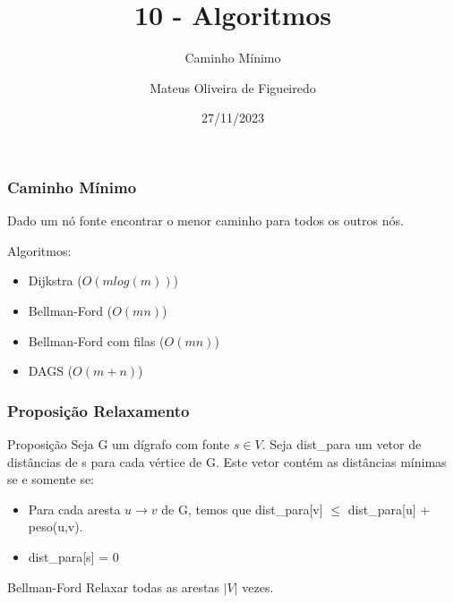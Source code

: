 \documentclass[aspectratio=169,usenames,dvipsnames]{beamer}
\title{10 - Algoritmos}
\subtitle{Caminho Mínimo}
\author{Mateus Oliveira de Figueiredo}
\date{27/11/2023}
\begin{document}
\begin{frame}
\titlepage
\end{frame}

\begin{frame}
\frametitle{Caminho Mínimo}

Dado um nó fonte encontrar o menor caminho para todos os outros nós.

\vfill
Algoritmos:
\begin{itemize}
  \item Dijkstra ($O(mlog(m))$)
  \item Bellman-Ford ($O(mn)$)
  \item Bellman-Ford com filas ($O(mn)$)
  \item DAGS ($O(m+n)$)
\end{itemize}
\vfill
\end{frame}


\begin{frame}
\frametitle{Proposição Relaxamento}

\vfill
\begin{block}{Proposição}
Seja G um dígrafo com fonte $s \in V$. Seja dist\_para um vetor de distâncias de s para cada vértice de G. 
Este vetor contém as distâncias mínimas se e somente se:
\begin{itemize}
  \item Para cada aresta $u \rightarrow v$ de G, temos que dist\_para[v] $\leq$ dist\_para[u] + peso(u,v).
  \item dist\_para[s] = 0
\end{itemize}
\end{block}
\vfill

\end{frame}

\begin{frame}{Bellman-Ford}
    Relaxar todas as arestas $|V|$ vezes.

    \vfill


    \vfill

    \vfill

\end{frame}
\end{document}

